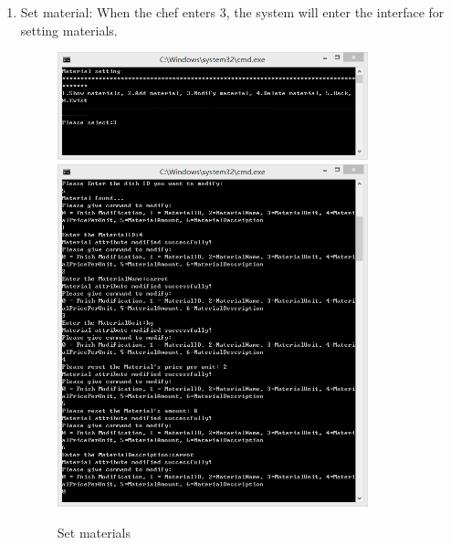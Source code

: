 \documentclass{article}
\begin{document}
\begin{enumerate}
    \item Set material:\newline 
    When the chef enters 3, the system will enter the interface for setting materials.
        \begin{figure}[H]
        \centering
        \includegraphics[width=0.85\textwidth]{Q/2/333331.png}
        \includegraphics[width=0.85\textwidth]{Q/2/333333.png}
        \caption{Set materials}
        \end{figure}
        

\end{enumerate}
\end{document}
